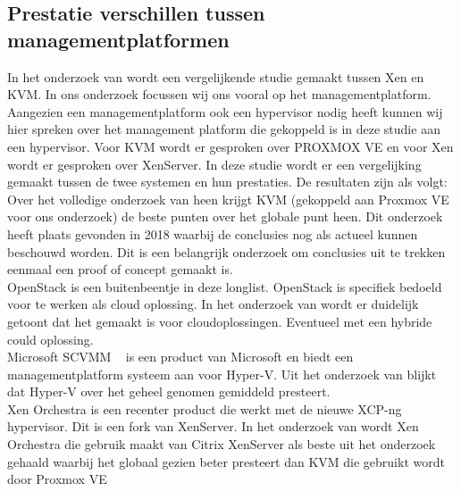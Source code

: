 \subsection{Prestatie verschillen tussen managementplatformen} \label{subsec:performace}
In het onderzoek van \textcite{algarni2018performance} wordt een vergelijkende studie gemaakt tussen Xen en KVM. In ons onderzoek focussen wij ons vooral op het managementplatform.
Aangezien een managementplatform ook een hypervisor nodig heeft kunnen wij hier spreken over het management platform die gekoppeld is in deze studie aan een hypervisor.
Voor KVM wordt er gesproken over PROXMOX VE en voor Xen wordt er gesproken over XenServer. In deze studie wordt er een vergelijking gemaakt tussen de twee systemen en hun prestaties. De resultaten zijn als volgt:
Over het volledige onderzoek van \textcite{algarni2018performance} heen krijgt KVM (gekoppeld aan Proxmox VE voor ons onderzoek) de beste punten over het globale punt heen. Dit onderzoek heeft plaats gevonden in 2018 waarbij de conclusies nog als actueel kunnen beschouwd worden.
Dit is een belangrijk onderzoek om conclusies uit te trekken eenmaal een proof of concept gemaakt is. \\
OpenStack is een buitenbeentje in deze longlist. OpenStack is specifiek bedoeld voor te werken als cloud oplossing. In het onderzoek van \textcite{callegati2014performance} wordt er duidelijk getoont dat het gemaakt is voor cloudoplossingen. Eventueel met een hybride could oplossing. \\
Microsoft SCVMM ~\autocite{microsoftvmm2025}  is een product van Microsoft en biedt een managementplatform systeem aan voor Hyper-V. Uit het onderzoek van \textcite{fayyad2013benchmarking} blijkt dat Hyper-V over het geheel genomen gemiddeld presteert. \\
Xen Orchestra is een recenter product die werkt met de nieuwe XCP-ng hypervisor. Dit is een fork van XenServer. In het onderzoek van \textcite{el2021server} wordt Xen Orchestra die gebruik maakt van Citrix XenServer als beste uit het onderzoek gehaald waarbij het globaal gezien beter presteert dan KVM die gebruikt wordt door Proxmox VE \\

